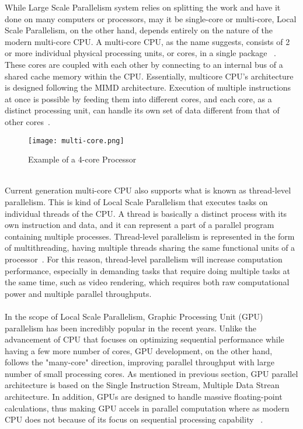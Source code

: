 While Large Scale Parallelism system relies on splitting the work and have it done on many computers or processors, may it be single-core or multi-core, Local Scale Parallelism, on the other hand, depends entirely on the nature of the modern multi-core CPU. A multi-core CPU, as the name suggests, consists of 2 or more individual physical processing units, or cores, in a single package ~\cite{multicore}. These cores are coupled with each other by connecting to an internal bus of a shared cache memory within the CPU. Essentially, multicore CPU's architecture is designed following the MIMD architecture. Execution of multiple instructions at once is possible by feeding them into different cores, and each core, as a distinct processing unit, can handle its own set of data different from that of other cores~\cite{multicore}. \\
\begin{figure}[H]
\texttt{[image: multi-core.png]}
\centering
\caption{Example of a 4-core Processor}
\end{figure}
~\\
Current generation multi-core CPU also supports what is known as thread-level parallelism. This is kind of Local Scale Parallelism that executes tasks on individual threads of the CPU. A thread is basically a distinct process with its own instruction and data, and it can represent a part of a parallel program containing multiple processes. Thread-level parallelism is represented in the form of multithreading, having multiple threads sharing the same functional units of a processor~\cite{multicore}. For this reason, thread-level parallelism will increase computation performance, especially in demanding tasks that require doing multiple tasks at the same time, such as video rendering, which requires both raw computational power and multiple parallel throughputs. \\
~\\
In the scope of Local Scale Parallelism, Graphic Processing Unit (GPU) parallelism has been incredibly popular in the recent years. Unlike the advancement of CPU that focuses on optimizing sequential performance while having a few more number of cores, GPU development, on the other hand, follows the "many-core" direction, improving parallel throughput with large number of small processing cores. As mentioned in previous section, GPU parallel architecture is based on the Single Instruction Stream, Multiple Data Strean architecture. In addition, GPUs are designed to handle massive floating-point calculations, thus making GPU accels in parallel computation where as modern CPU does not because of its focus on sequential processing capability ~\cite{GPU}. \\
